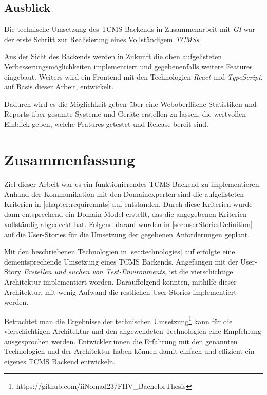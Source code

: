 \documentclass[a4paper, fontsize=11pt, parskip=half, twoside]{scrreprt}
\begin{document}
	\section{Ausblick}
	Die technische Umsetzung des \ac{TCMS} Backends in Zusammenarbeit mit \emph{\acl{GI}} war der erste Schritt zur Realisierung eines Vollständigem \emph{\acl{TCMS}s}.
	
	Aus der Sicht des Backends werden in Zukunft die oben aufgelisteten Verbesserungsmöglichkeiten implementiert und gegebenenfalls weitere Features eingebaut.
	Weiters wird ein Frontend mit den Technologien \emph{React} und \emph{TypeScript}, auf Basis dieser Arbeit, entwickelt.
	
	Dadurch wird es die Möglichkeit geben über eine Weboberfläche Statistiken und Reports über gesamte Systeme und Geräte erstellen zu lassen, die wertvollen Einblick geben, welche Features getestet und Release bereit sind.
	
	\chapter{Zusammenfassung}
	Ziel dieser Arbeit war es ein funktionierendes \ac{TCMS} Backend zu implementieren. 
	Anhand der Kommunikation mit den Domainexperten sind die aufgelisteten Kriterien in \autoref{chapter:requiremnts} auf  entstanden.
	Durch diese Kriterien wurde dann entsprechend ein Domain-Model erstellt, das die angegebenen Kriterien vollständig abgedeckt hat.
	Folgend darauf wurden in \autoref{sec:userStoriesDefinition} auf  die User-Stories für die Umsetzung der gegebenen Anforderungen geplant.	
	
	Mit den beschriebenen Technologien in \autoref{sec:technologies} auf  erfolgte eine dementsprechende Umsetzung eines \ac{TCMS} Backends.
	Angefangen mit der User-Story \emph{Erstellen und suchen von Test-Environments}, ist die vierschichtige Architektur implementiert worden.
	Darauffolgend konnten, mithilfe dieser Architektur, mit wenig Aufwand die restlichen User-Stories implementiert werden.
	
	Betrachtet man die Ergebnisse der technischen Umsetzung\footnote{https://github.com/iiNomad23/FHV\_BachelorThesis} kann für die vierschichtigen Architektur und den angewendeten Technologien eine Empfehlung ausgesprochen werden. 
	Entwickler:innen die Erfahrung mit den genannten Technologien und der Architektur haben können damit einfach und effizient ein eigenes \ac{TCMS} Backend entwickeln.
	
\end{document}
